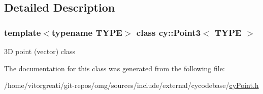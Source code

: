 \subsection{Detailed Description}
\subsubsection*{template$<$typename T\+Y\+PE$>$\newline
class cy\+::\+Point3$<$ T\+Y\+P\+E $>$}

3D point (vector) class 

The documentation for this class was generated from the following file\+:\begin{DoxyCompactItemize}
\item 
/home/vitorgreati/git-\/repos/omg/sources/include/external/cycodebase/\mbox{\hyperlink{cy_point_8h}{cy\+Point.\+h}}\end{DoxyCompactItemize}
